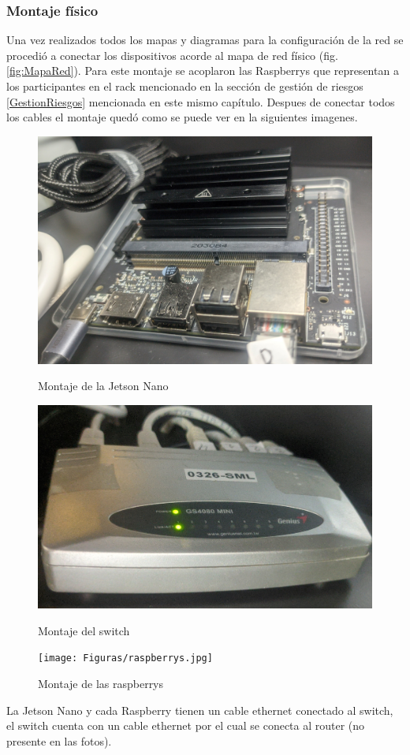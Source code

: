 \subsubsection{Montaje físico}
Una vez realizados todos los mapas y diagramas para la configuración de la red se procedió a conectar los dispositivos acorde al mapa de red físico (fig. \ref{fig:MapaRed}). Para este montaje se acoplaron las Raspberrys que representan a los participantes en el rack mencionado en la sección de gestión de riesgos \ref{GestionRiesgos} mencionada en este mismo capítulo. Despues de conectar todos los cables el montaje quedó como se puede ver en la siguientes imagenes.
\begin{figure}[H]
    \centering
    \begin{minipage}[t]{0.49\linewidth}  %
        \includegraphics[height=0.2\textheight]{Figuras/jetsonnano.jpg}
        \caption{Montaje de la Jetson Nano} 
    \end{minipage}
    \hfill
    \begin{minipage}[t]{0.5\linewidth}  %
        \includegraphics[height=0.2\textheight]{Figuras/switch.jpg}
        \caption{Montaje del switch} 
    \end{minipage}

    \texttt{[image: Figuras/raspberrys.jpg]}
    \caption{Montaje de las raspberrys}     
\end{figure}

La Jetson Nano y cada Raspberry tienen un cable ethernet conectado al switch, el switch cuenta con un cable ethernet por el cual se conecta al router (no presente en las fotos).
